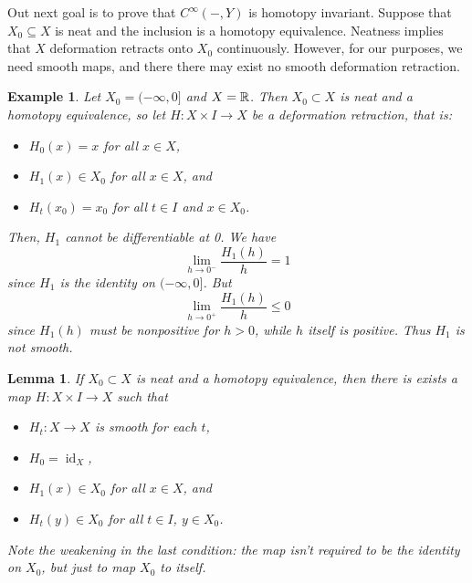 \documentclass{article}
\newtheorem{lemma}[theorem]{Lemma}
\newtheorem{example}[theorem]{Example}
\newtheorem{proposed work}[theorem]{Proposed Work}
\DeclareMathOperator{\id}{id}
\begin{document}
Out next goal is to prove that $C^\infty(-,Y)$ is homotopy invariant. Suppose that $X_0\subseteq X$ is neat and the inclusion is a homotopy equivalence. Neatness implies that $X$ deformation retracts onto $X_0$ continuously. However, for our purposes, we need smooth maps, and there there may exist no smooth deformation retraction.
\begin{example}
  Let $X_0 = (-\infty,0]$ and $X=\mathbb R$. Then $X_0\subset X$ is neat and a homotopy equivalence, so let $H:X\times I\to X$ be a deformation retraction, that is:
  \begin{itemize}
  \item $H_0(x)=x$ for all $x\in X$,
  \item $H_1(x)\in X_0$ for all $x\in X$, and
  \item $H_t(x_0)=x_0$ for all $t\in I$ and $x\in X_0$.
  \end{itemize}
 Then, $H_1$ cannot be differentiable at 0. We have
\[
\lim_{h\to0^-}\frac{H_1(h)}{h} = 1
\]
since $H_1$ is the identity on $(-\infty,0]$. But
\[
\lim_{h\to0^+}\frac{H_1(h)}{h} \le 0
\]
since $H_1(h)$ must be nonpositive for $h>0$, while $h$ itself is positive. Thus $H_1$ is not smooth.
\end{example}
\begin{lemma}
  If $X_0\subset X$ is neat and a homotopy equivalence, then there is exists a map $H:X\times I\to X$ such that
  \begin{itemize}
  \item $H_t: X\to X$ is smooth for each $t$,
  \item $H_0 = \id_X$,
  \item $H_1(x)\in X_0$ for all $x\in X$, and
  \item $H_t(y)\in X_0$ for all $t\in I$, $y\in X_0$.
  \end{itemize}
Note the weakening in the last condition: the map isn't required to be the identity on $X_0$, but just to map $X_0$ to itself.
\end{lemma}
\end{document}
